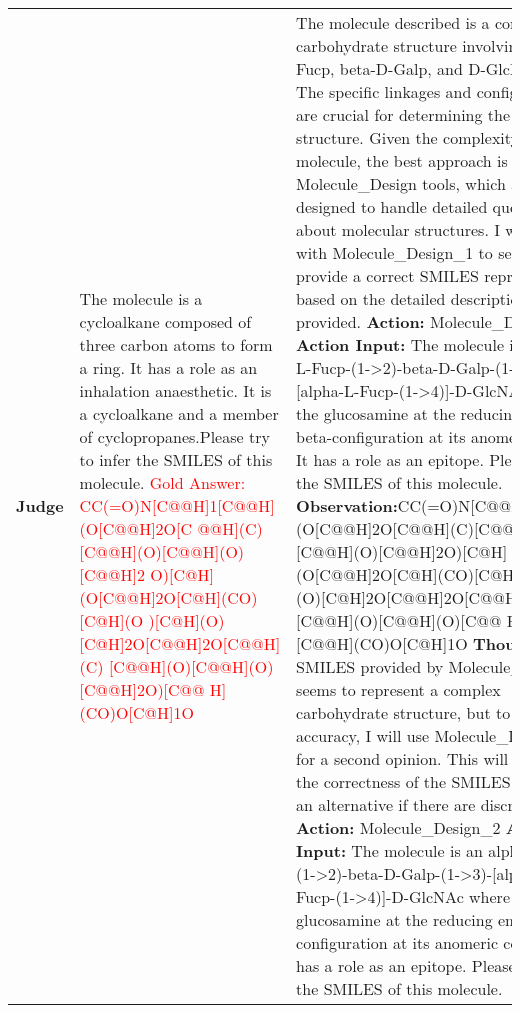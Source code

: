 \begin{table*}[!htb]
{\begin{tabular}[l]{|>{\raggedright\arraybackslash}m{1.5cm}|>{\raggedright\arraybackslash}m{4cm}|>{\raggedright\arraybackslash}m{10cm}|}
    \hline
    \textbf{Judge}&The molecule is a cycloalkane composed of three carbon atoms to form a ring. It has a role as an inhalation anaesthetic. It is a cycloalkane and a member of cyclopropanes.Please try to infer the SMILES of this molecule.
    \newline
    \newline
    \newline
    \textcolor{red}{Gold Answer: CC(=O)N[C@@H]1[C@@H](O[C@@H]2O[C
    @@H](C)[C@@H](O)[C@@H](O)[C@@H]2
    O)[C@H](O[C@@H]2O[C@H](CO)[C@H](O
    )[C@H](O)[C@H]2O[C@@H]2O[C@@H](C)
    [C@@H](O)[C@@H](O)[C@@H]2O)[C@@
    H](CO)O[C@H]1O
}&The molecule described is a complex carbohydrate structure involving alpha-L-Fucp, beta-D-Galp, and D-GlcNAc units. The specific linkages and configurations are crucial for determining the correct structure. Given the complexity of the molecule, the best approach is to use the Molecule\_Design tools, which are designed to handle detailed questions about molecular structures. I will start with Molecule\_Design\_1 to see if it can provide a correct SMILES representation based on the detailed description provided.
\newline
\textbf{Action:} Molecule\_Design\_1
\newline
\textbf{Action Input:} The molecule is an alpha-L-Fucp-(1->2)-beta-D-Galp-(1->3)-[alpha-L-Fucp-(1->4)]-D-GlcNAc where the glucosamine at the reducing end has beta-configuration at its anomeric centre. It has a role as an epitope. Please provide the SMILES of this molecule.
\newline
\textbf{Observation:}CC(=O)N[C@@H]1[C@@H](O[C@@H]2O[C@@H](C)[C@@H](O)[C@@H](O)[C@@H]2O)[C@H]
(O[C@@H]2O[C@H](CO)[C@H](O)[C@H](O)[C@H]2O[C@@H]2O[C@@H](C)[C@@H](O)[C@@H](O)[C@@
H]2O)[C@@H](CO)O[C@H]1O
\newline
\textbf{Thought:}The SMILES provided by Molecule\_Design\_1 seems to represent a complex carbohydrate structure, but to ensure accuracy, I will use Molecule\_Design\_2 for a second opinion. This will help verify the correctness of the SMILES or provide an alternative if there are discrepancies.
\newline
\textbf{Action:} Molecule\_Design\_2
\newline
\textbf{Action Input:} The molecule is an alpha-L-Fucp-(1->2)-beta-D-Galp-(1->3)-[alpha-L-Fucp-(1->4)]-D-GlcNAc where the glucosamine at the reducing end has beta-configuration at its anomeric centre. It has a role as an epitope. Please provide the SMILES of this molecule.
\newline

\end{tabular}}
\end{table*}
